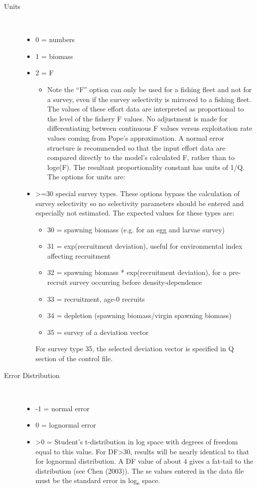 \begin{description}
	\item[\hypertarget{IndexUnits}{Units}]\hfill\\	
	\begin{itemize}
		\item 0  = numbers
		\item 1  = biomass
		\item 2  = F
		\begin{itemize}
			\item 	Note the “F” option can only be used for a fishing fleet and not for a survey, even if the survey selectivity is mirrored to a fishing fleet.  The values of these effort data are interpreted as proportional to the level of the fishery F values.  No adjustment is made for differentiating between continuous F values versus exploitation rate values coming from Pope’s approximation.  A normal error structure is recommended so that the input effort data are compared directly to the model’s calculated F, rather than to loge(F).  The resultant proportionality constant has units of 1/Q. The options for units are:	
		\end{itemize}
		\item >=30 special survey types.  These options bypass the calculation of survey selectivity so no selectivity parameters should be entered and especially not estimated.  The expected values for these types are:
		\begin{itemize}
			\item 30 = spawning biomass (e.g. for an egg and larvae survey)
			\item 31 = exp(recruitment deviation), useful for environmental index affecting recruitment
			\item 32 = spawning biomass * exp(recruitment deviation), for a pre-recruit survey occurring before density-dependence
			\item 33 = recruitment, age-0 recruits
			\item 34 = depletion (spawning biomass/virgin spawning biomass)
			\item 35 = survey of a deviation vector
		\end{itemize}
	    For survey type 35, the selected deviation vector is specified in Q section of the control file.
	\end{itemize}
	
	\item[Error Distribution]\
	\begin{itemize}
		\item -1 = normal error
		\item  0 = lognormal error 
		\item >0 = Student's t-distribution in log space with degrees of freedom equal to this value.  For DF>30, results will be nearly identical to that for lognormal distribution.  A DF value of about 4 gives a fat-tail to the distribution (see Chen (2003)).  The se values entered in the data file must be the standard error in log\textsubscript{e} space.
	\end{itemize}


\end{description}
